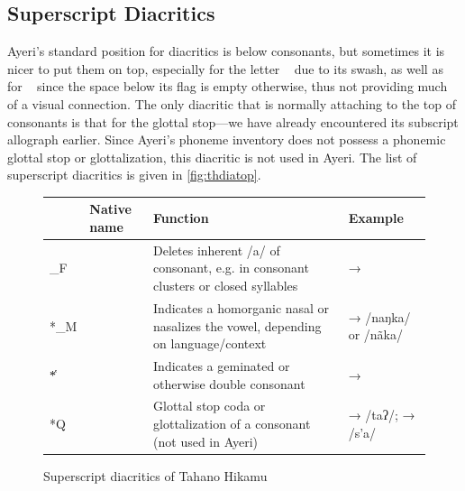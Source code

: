\subsection{Superscript Diacritics}

Ayeri's standard position for diacritics is below consonants, but sometimes it 
is nicer to put them on top, especially for the letter ~ due to 
its swash, as well as for ~ since the space below its flag is 
empty otherwise, thus not providing much of a visual connection. The only 
diacritic that is normally attaching to the top of consonants is that for the 
glottal stop---we have already encountered its subscript allograph earlier. 
Since Ayeri's phoneme inventory does not possess a phonemic glottal stop or 
glottalization, this diacritic is not used in Ayeri. The list of superscript 
diacritics is given in \autoref{fig:thdiatop}.

\begin{figure}[htp]
\caption{Superscript diacritics of Tahano Hikamu}
\begin{tabu} to 
\toprule
\tableheaderfont

	& Native name
	& Function
	& Example
	\\
	
\toprule

*\_F
	& 
	& Deletes inherent /a/ of consonant, e.g. in consonant clusters or 
		closed syllables
	&  → 
	\\
	
\midrule

*\_M
	& 
	& Indicates a homorganic nasal or nasalizes the vowel, depending on 
		language/context
	&  →  /naŋka/ or /nãka/
	\\
	
\midrule

*̔
	& 
	& Indicates a geminated or otherwise double consonant
	&  → 
	\\
	
\midrule

*Q
	& 
	& Glottal stop coda or glottalization of a consonant (not used in Ayeri)
	&  →  /taʔ/;\newline
		 →  /s’a/
	\\

\bottomrule
\end{tabu}
\label{fig:thdiatop}
\end{figure}

